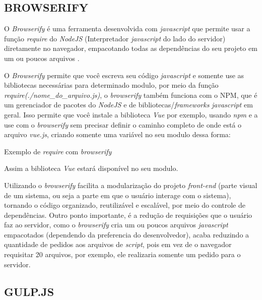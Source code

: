 \subsection{BROWSERIFY}
O \textit{Browserify} é uma ferramenta desenvolvida com \textit{javascript} que permite usar a função \textit{require} do \textit{NodeJS} (Interpretador \textit{javascript} do lado do servidor) diretamente no navegador, empacotando todas as dependências do seu projeto em um ou poucos arquivos \cite{browserify}.
\par
O \textit{Browserify} permite que você escreva seu código \textit{javascript} e somente use as bibliotecas necessárias para determinado modulo, por meio da função \textit{require(./nome\_do\_arquivo.js)}, o \textit{browserify} também funciona com o \ac{NPM}, que é um gerenciador de pacotes do \textit{NodeJS} e de bibliotecas/\textit{frameworks} \textit{javascript} em geral. Isso permite que você instale a biblioteca \textit{Vue} por exemplo, usando \textit{npm} e a use com o \textit{browserify} sem precisar definir o caminho completo de onde está o arquivo \textit{vue.js}, criando somente uma variável no seu modulo dessa forma:
\begin{listing}[H]
    \caption{Exemplo de \textit{require} com \textit{browserify}}
    \label{lst:browserify-vue-example}
\end{listing}
Assim a biblioteca \textit{Vue} estará disponível no seu modulo.
\par
Utilizando o \textit{browserify} facilita a modularização do projeto \textit{front-end} (parte visual de um sistema, ou seja a parte em que o usuário interage com o sistema), tornando o código organizado, reutilizável e escalável, por meio do controle de dependências. Outro ponto importante, é a redução de requisições que o usuário faz ao servidor, como o \textit{browserify} cria um ou poucos arquivos \textit{javascript} empacotados (dependendo da preferencia do desenvolvedor), acaba reduzindo a quantidade de pedidos aos arquivos de \textit{script}, pois em vez de o navegador requisitar 20 arquivos, por exemplo, ele realizaria somente um pedido para o servidor.

\subsection{GULP.JS}


